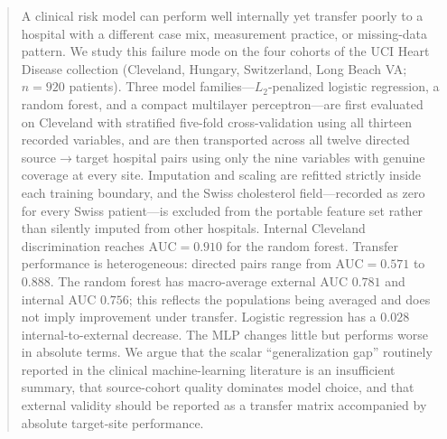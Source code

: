 \documentclass[manuscript,nonacm]{acmart}
\begin{document}
\begin{abstract}
A clinical risk model can perform well internally yet transfer poorly to a hospital
with a different case mix, measurement practice, or missing-data pattern. We study this
failure mode on the
four cohorts of the UCI Heart Disease collection (Cleveland, Hungary, Switzerland,
Long Beach VA; $n=920$ patients). Three model families---$L_2$-penalized logistic
regression, a random forest, and a compact multilayer perceptron---are first evaluated
on Cleveland with stratified five-fold cross-validation using all thirteen recorded
variables, and are then transported across all twelve directed source$\rightarrow$target
hospital pairs using only the nine variables with genuine coverage at every site.
Imputation and scaling are refitted strictly inside each training boundary, and the
Swiss cholesterol field---recorded as zero for every Swiss patient---is excluded from
the portable feature set rather than silently imputed from other hospitals. Internal
Cleveland discrimination reaches $\mathrm{AUC}=0.910$ for the random forest. Transfer
performance is heterogeneous: directed pairs range from $\mathrm{AUC}=0.571$ to
$0.888$. The random forest has macro-average external AUC $0.781$ and internal AUC
$0.756$; this reflects the populations being averaged and does not imply improvement
under transfer. Logistic regression has a $0.028$ internal-to-external decrease. The
MLP changes little but performs worse in absolute terms. We argue that the scalar
``generalization gap'' routinely reported in the clinical machine-learning literature
is an insufficient summary, that source-cohort quality dominates model choice, and
that external validity should be reported as a transfer matrix accompanied by absolute
target-site performance.
\end{abstract}



\maketitle

\end{document}
